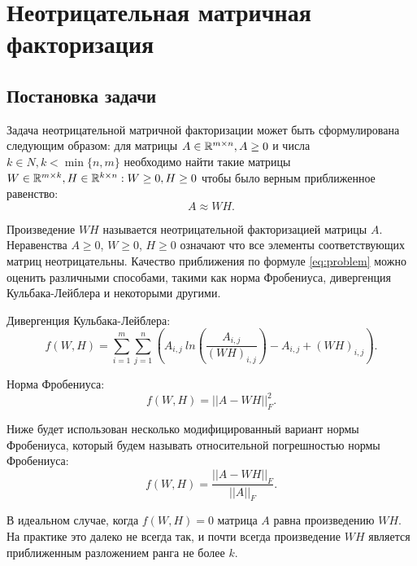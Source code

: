 
\chapter{Неотрицательная матричная факторизация}





\section{Постановка задачи}

Задача неотрицательной матричной факторизации может быть сформулирована следующим образом:
для матрицы $A \in \mathbb{R}^{m \times n}, A \geq 0$ и числа $k \in N, k < \min\{n, m\}$
необходимо найти  такие матрицы $W \in \mathbb{R}^{m \times k}, H \in \mathbb{R}^{k \times n} : W \geq 0, H \geq 0$ чтобы было верным приближенное равенство:
\begin{equation} \label{eq:problem}
  A \approx W H.
\end{equation}

Произведение $WH$ называется неотрицательной факторизацией матрицы $A$. Неравенства $A \geq 0$, $W \geq 0$, $H \geq 0$ означают что все элементы соответствующих матриц неотрицательны.
Качество приближения по формуле \eqref{eq:problem} можно оценить различными способами, такими как норма Фробениуса,
дивергенция Кульбака-Лейблера и некоторыми другими.

Дивергенция Кульбака-Лейблера:
\begin{equation*}
  f(W, H) =
    \sum_{i=1}^m \sum_{j=1}^n
    \left(
      A_{i,j} \
      ln\left(
        \frac{A_{i,j}}{(WH)_{i,j}}
      \right)
      - A_{i,j}
      + (WH)_{i,j}
    \right).
\end{equation*}

Норма Фробениуса:
\begin{equation*}
  f(W, H) = || A - WH ||^2_F.
\end{equation*}

Ниже будет использован несколько модифицированный вариант нормы Фробениуса,
который будем называть относительной погрешностью нормы Фробениуса:
\begin{equation} \label{eq:frob_norm}
  f(W, H) = \dfrac{||A - WH||_F}{|| A ||_F}.
\end{equation}

В идеальном случае, когда $f(W,H)=0$ матрица $A$ равна произведению $WH$.
На практике это далеко не всегда так, и почти всегда произведение $WH$ является приближенным разложением ранга не более $k$.

